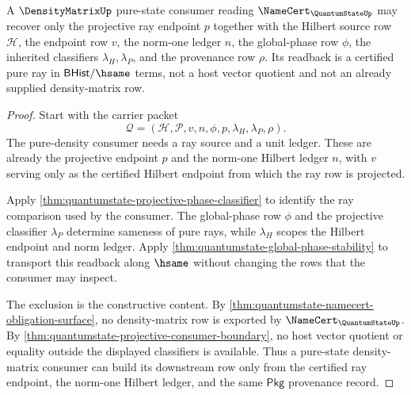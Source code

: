 \begin{theorem}
\label{thm:quantumstate-densitymatrix-pure-ray-readback}
A $\DensityMatrixUp$ pure-state consumer reading
$\NameCert_{\QuantumStateUp}$ may recover only the projective ray endpoint
$p$ together with the Hilbert source row $\mathcal{H}$, the endpoint row
$v$, the norm-one ledger $n$, the global-phase row $\phi$, the inherited
classifiers $\lambda_H,\lambda_P$, and the provenance row $\rho$. Its
readback is a certified pure ray in $\mathsf{BHist}/\hsame$ terms, not a
host vector quotient and not an already supplied density-matrix row.
\end{theorem}
\begin{proof}
Start with the carrier packet
$$
\mathcal{Q}=(\mathcal{H},\mathcal{P},v,n,\phi,p,\lambda_H,\lambda_P,\rho).
$$
The pure-density consumer needs a ray source and a unit ledger. These are
already the projective endpoint $p$ and the norm-one Hilbert ledger $n$,
with $v$ serving only as the certified Hilbert endpoint from which the ray
row is projected.

Apply \autoref{thm:quantumstate-projective-phase-classifier} to identify the
ray comparison used by the consumer. The global-phase row $\phi$ and the
projective classifier $\lambda_P$ determine sameness of pure rays, while
$\lambda_H$ scopes the Hilbert endpoint and norm ledger. Apply
\autoref{thm:quantumstate-global-phase-stability} to transport this
readback along $\hsame$ without changing the rows that the consumer may
inspect.

The exclusion is the constructive content. By
\autoref{thm:quantumstate-namecert-obligation-surface}, no density-matrix row
is exported by $\NameCert_{\QuantumStateUp}$. By
\autoref{thm:quantumstate-projective-consumer-boundary}, no host vector
quotient or equality outside the displayed classifiers is available. Thus a
pure-state density-matrix consumer can build its downstream row only from
the certified ray endpoint, the norm-one Hilbert ledger, and the same
$\mathsf{Pkg}$ provenance record.
\end{proof}

